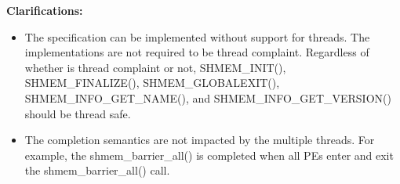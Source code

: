 {\bf Clarifications:}
 
\begin{itemize}
\item[]
The \openshmem{} specification can be implemented without support for threads.
The \openshmem{} implementations are not required to be thread complaint.
Regardless of whether \openshmem{} is thread complaint or not, SHMEM\_INIT(),
SHMEM\_FINALIZE(), SHMEM\_GLOBALEXIT(), SHMEM\_INFO\_GET\_NAME(), and
SHMEM\_INFO\_GET\_VERSION() should be thread safe.
 

\item[]
The completion semantics are not impacted by the multiple threads. 
For example, the shmem\_barrier\_all() is completed when all \acp{PE} enter and
exit the shmem\_barrier\_all() call. 

 
\end{itemize}
